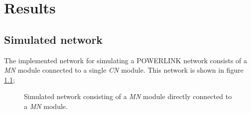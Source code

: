 \chapter{Results}
\label{cha:results}

\section{Simulated network}
\label{sec:results_network}
The implemented network for simulating a POWERLINK network consists of a \emph{MN} module connected to a single \emph{CN} module.
This network is shown in figure \ref{fig:results_mn_single_cn};

\begin{figure}
    \centering
    \caption{Simulated network consisting of a \emph{MN} module directly connected to a \emph{MN} module.}
    \label{fig:results_mn_single_cn}
\end{figure}
